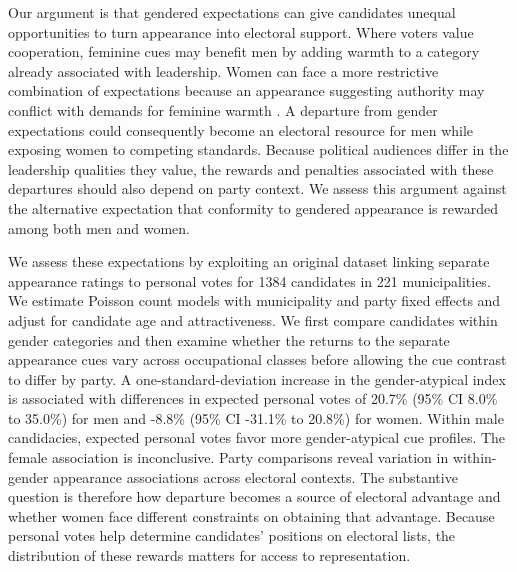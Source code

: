 \documentclass[11pt,a4paper]{article}\usepackage[]{graphicx}\usepackage[]{xcolor}
\begin{document}
Our argument is that gendered expectations can give candidates unequal opportunities to turn appearance into electoral support. Where voters value cooperation, feminine cues may benefit men by adding warmth to a category already associated with leadership. Women can face a more restrictive combination of expectations because an appearance suggesting authority may conflict with demands for feminine warmth \parencite{Eagly2002,RudmanGlick2001}. A departure from gender expectations could consequently become an electoral resource for men while exposing women to competing standards. Because political audiences differ in the leadership qualities they value, the rewards and penalties associated with these departures should also depend on party context. We assess this argument against the alternative expectation that conformity to gendered appearance is rewarded among both men and women.

We assess these expectations by exploiting an original dataset linking separate appearance ratings to personal votes for 1384 candidates in 221 municipalities. We estimate Poisson count models with municipality and party fixed effects and adjust for candidate age and attractiveness. We first compare candidates within gender categories and then examine whether the returns to the separate appearance cues vary across occupational classes before allowing the cue contrast to differ by party. A one-standard-deviation increase in the gender-atypical index is associated with differences in expected personal votes of 20.7\% (95\% CI 8.0\% to 35.0\%) for men and -8.8\% (95\% CI -31.1\% to 20.8\%) for women. Within male candidacies, expected personal votes favor more gender-atypical cue profiles. The female association is inconclusive. Party comparisons reveal variation in within-gender appearance associations across electoral contexts. The substantive question is therefore how departure becomes a source of electoral advantage and whether women face different constraints on obtaining that advantage. Because personal votes help determine candidates' positions on electoral lists, the distribution of these rewards matters for access to representation.
\end{document}
